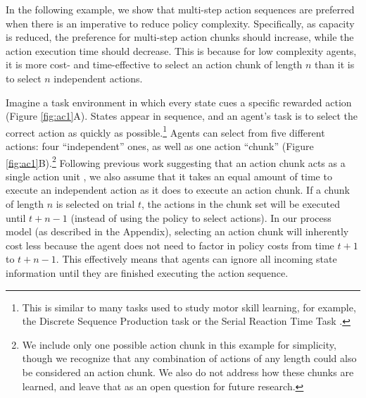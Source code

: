 \documentclass[11pt]{article}
\begin{document}
In the following example, we show that multi-step action sequences are preferred when there is an imperative to reduce policy complexity. Specifically, as capacity is reduced, the preference for multi-step action chunks should increase, while the action execution time should decrease. This is because for low complexity agents, it is more cost- and time-effective to select an action chunk of length $n$ than it is to select $n$ independent actions.

Imagine a task environment in which every state cues a specific rewarded action (Figure \ref{fig:ac1}A). States appear in sequence, and an agent's task is to select the correct action as quickly as possible.\footnote{This is similar to many tasks used to study motor skill learning, for example, the Discrete Sequence Production task \citep{Verwey1999-fn} or the Serial Reaction Time Task \citep{Nissen1987-vn,Robertson2007-pv}.} Agents can select from five different actions: four ``independent'' ones, as well as one action ``chunk'' (Figure \ref{fig:ac1}B).\footnote{We include only one possible action chunk in this example for simplicity, though we recognize that any combination of actions of any length could also be considered an action chunk. We also do not address how these chunks are learned, and leave that as an open question for future research.} Following previous work suggesting that an action chunk acts as a single action unit \citep{graybiel98,sakai03}, we also assume that it takes an equal amount of time to execute an independent action as it does to execute an action chunk. If a chunk of length $n$ is selected on trial $t$, the actions in the chunk set will be executed until $t+n-1$ (instead of using the policy to select actions). In our process model (as described in the Appendix), selecting an action chunk will inherently cost less because the agent does not need to factor in policy costs from time $t+1$ to $t+n-1$. This effectively means that agents can ignore all incoming state information until they are finished executing the action sequence. 
\end{document}
